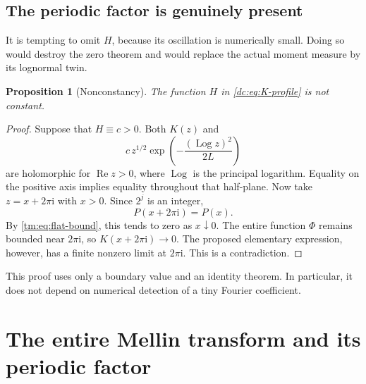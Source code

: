 \documentclass[11pt,a4paper,oneside,openany]{book}
\numberwithin{equation}{chapter}
\newtheorem{proposition}[theorem]{Proposition}
\theoremstyle{definition}
\theoremstyle{remark}
\newcommand{\ii}{\mathrm i}
\DeclareMathOperator{\Log}{Log}
\DeclareMathOperator{\Rea}{Re}
\begin{document}
\section{The periodic factor is genuinely present}
It is tempting to omit $H$, because its oscillation is numerically
small. Doing so would destroy the zero theorem and would replace the
actual moment measure by its lognormal twin.

\begin{proposition}[Nonconstancy]
\label{dc:prop:H-nonconstant}
The function $H$ in \cref{dc:eq:K-profile} is not constant.
\end{proposition}
\begin{proof}
Suppose that $H\equiv c>0$. Both $K(z)$ and
\[
 c\,z^{1/2}\exp\left(-\frac{(\Log z)^2}{2L}\right)
\]
are holomorphic for $\Rea z>0$, where $\Log$ is the principal
logarithm. Equality on the positive axis implies equality throughout
that half-plane. Now take $z=x+2\pi\ii$ with $x>0$. Since $2^j$ is
an integer,
\[
 P(x+2\pi\ii)=P(x).
\]
By \cref{tm:eq:flat-bound}, this tends to zero as $x\downarrow0$.
The entire function $\Phi$ remains bounded near $2\pi\ii$, so
$K(x+2\pi\ii)\to0$. The proposed elementary expression, however,
has a finite nonzero limit at $2\pi\ii$. This is a contradiction.
\end{proof}

This proof uses only a boundary value and an identity theorem. In
particular, it does not depend on numerical detection of a tiny
Fourier coefficient.

\chapter{The entire Mellin transform and its periodic factor}
\label{dc:sec:mellin}
\end{document}

